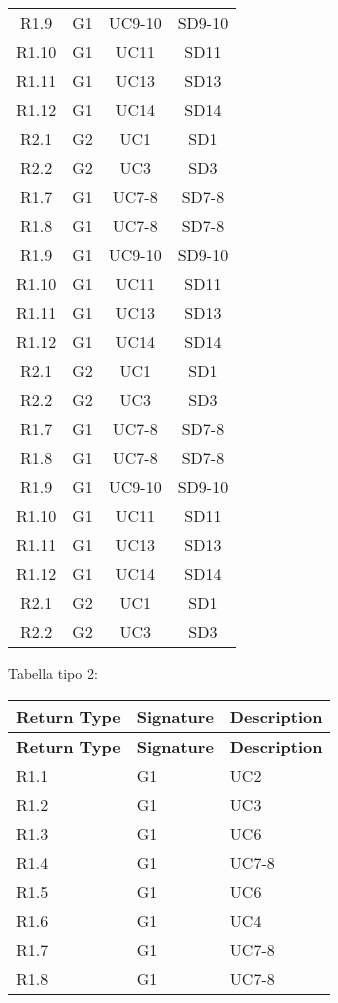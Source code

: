 \begin{longtable}{cccc}
    R1.9 & G1 & UC9-10 & SD9-10 \\
    R1.10 & G1 & UC11  & SD11 \\
    R1.11 & G1 & UC13  & SD13 \\
    R1.12 & G1 & UC14  & SD14 \\
    R2.1 & G2 & UC1    & SD1  \\
    R2.2 & G2 & UC3    & SD3  \\
    R1.7 & G1 & UC7-8  & SD7-8 \\
    R1.8 & G1 & UC7-8  & SD7-8 \\
    R1.9 & G1 & UC9-10 & SD9-10 \\
    R1.10 & G1 & UC11  & SD11 \\
    R1.11 & G1 & UC13  & SD13 \\
    R1.12 & G1 & UC14  & SD14 \\
    R2.1 & G2 & UC1    & SD1  \\
    R2.2 & G2 & UC3    & SD3  \\
    R1.7 & G1 & UC7-8  & SD7-8 \\
    R1.8 & G1 & UC7-8  & SD7-8 \\
    R1.9 & G1 & UC9-10 & SD9-10 \\
    R1.10 & G1 & UC11  & SD11 \\
    R1.11 & G1 & UC13  & SD13 \\
    R1.12 & G1 & UC14  & SD14 \\
    R2.1 & G2 & UC1    & SD1  \\
    R2.2 & G2 & UC3    & SD3  \\
    \end{longtable}
    
    Tabella tipo 2:

\begin{longtable}{|p{}|p{}|p{}|}
    \hline
    \textbf{Return Type} & \textbf{Signature} & \textbf{Description} \\
    \hline
    \endfirsthead
    \hline
    \textbf{Return Type} & \textbf{Signature} & \textbf{Description} \\
    \hline
    \endhead
    
    \hline
    \endfoot
    
    \hline
    \endlastfoot
    
    R1.1 & G1 & UC2   \\
    R1.2 & G1 & UC3   \\
    R1.3 & G1 & UC6   \\
    R1.4 & G1 & UC7-8  \\
    R1.5 & G1 & UC6   \\
    R1.6 & G1 & UC4   \\
    R1.7 & G1 & UC7-8  \\
    R1.8 & G1 & UC7-8  \\
\end{longtable}

